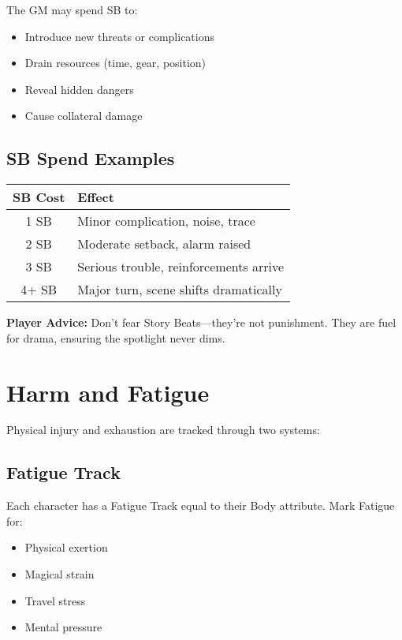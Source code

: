 \documentclass[11pt,twoside,openany]{book}
\begin{document}
The GM may spend SB to:
\begin{itemize}
\item Introduce new threats or complications
\item Drain resources (time, gear, position)
\item Reveal hidden dangers
\item Cause collateral damage
\end{itemize}

\subsection*{SB Spend Examples}

\begin{center}
\begin{tabular}{|c|l|}
\hline
\textbf{SB Cost} & \textbf{Effect} \\
\hline
1 SB & Minor complication, noise, trace \\
2 SB & Moderate setback, alarm raised \\
3 SB & Serious trouble, reinforcements arrive \\
4+ SB & Major turn, scene shifts dramatically \\
\hline
\end{tabular}
\end{center}

\textbf{Player Advice:} Don't fear Story Beats—they're not punishment. They are fuel for drama, ensuring the spotlight never dims.

\section*{Harm and Fatigue} 

Physical injury and exhaustion are tracked through two systems:

\subsection*{Fatigue Track}

Each character has a Fatigue Track equal to their Body attribute. Mark Fatigue for:
\begin{itemize}
\item Physical exertion
\item Magical strain
\item Travel stress
\item Mental pressure
\end{itemize}
\end{document}
